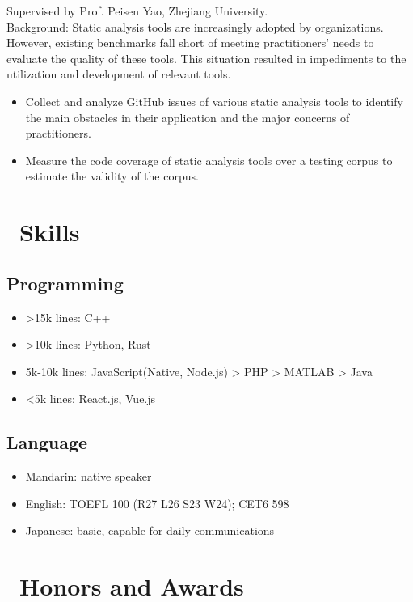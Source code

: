\documentclass{resume}
\begin{document}
Supervised by Prof. Peisen Yao, Zhejiang University.\\
Background: Static analysis tools are increasingly adopted by organizations. However, existing benchmarks fall short of meeting practitioners' needs to evaluate the quality of these tools. This situation resulted in impediments to the utilization and development of relevant tools.
\begin{itemize}
  \item Collect and analyze GitHub issues of various static analysis tools to identify the main obstacles in their application and the major concerns of practitioners.
  \item Measure the code coverage of static analysis tools over a testing corpus to estimate the validity of the corpus.
\end{itemize}

\section{\faCogs\ Skills}
\subsection{Programming}
\begin{itemize}[parsep=0.5ex]
  \item >15k lines: C++
  \item >10k lines: Python, Rust
  \item 5k-10k lines: JavaScript(Native, Node.js) > PHP > MATLAB > Java
  \item <5k lines: React.js, Vue.js
\end{itemize}
\subsection{Language}
\begin{itemize}[parsep=0.5ex]
  \item Mandarin: native speaker
  \item English: TOEFL 100 (R27 L26 S23 W24); CET6 598
  \item Japanese: basic, capable for daily communications
\end{itemize}

\section{\faHeartO\ Honors and Awards}
\end{document}
